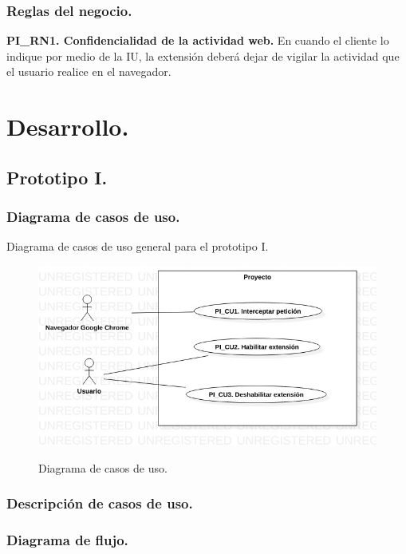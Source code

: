 \documentclass[12pt, a4paper, titlepage]{article}
\begin{document}
			\subsubsection{Reglas del negocio.\\}
				{\setlength{\parindent}{12pt}
					
					\textbf{PI\_RN1. Confidencialidad de la actividad web.} En cuando el cliente lo indique por medio de la IU, la extensión deberá dejar de vigilar la actividad que el usuario realice en el navegador.\\
					
				}\newpage
	\newpage
	\section{\textcolor{azulescom}{Desarrollo.}}
		\subsection{Prototipo I.}
			\subsubsection{Diagrama de casos de uso.}
			Diagrama de casos de uso general para el prototipo I.
			\begin{figure}[htb]
				\begin{center}
					\label{fig1} 
					\includegraphics[width=17cm]{./imagenes/UCD_1.jpg}
					\caption{Diagrama de casos de uso.}
				\end{center}
			\end{figure}
			\subsubsection{Descripción de casos de uso.}
			
\subsubsection{Diagrama de flujo.}
\end{document}
